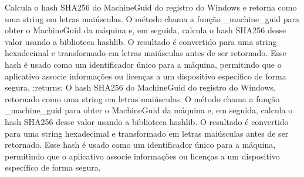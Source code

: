 \documentclass[letterpaper,10pt,english]{sphinxmanual}
\begin{document}
\begin{fulllineitems}
\label{\detokenize{api/simple_lock:simple_lock.machine_id}}
\pysigstartsignatures
\pysiglinewithargsret
{}
{}
{}
\pysigstopsignatures
\sphinxAtStartPar
Calcula o hash SHA\sphinxhyphen{}256 do MachineGuid do registro do Windows e retorna como uma string em letras maiúsculas. O método chama a função \_machine\_guid para obter o MachineGuid da máquina e, em seguida, calcula o hash SHA\sphinxhyphen{}256 desse valor usando a biblioteca hashlib. O resultado é convertido para uma string hexadecimal e transformado em letras maiúsculas antes de ser retornado. Esse hash é usado como um identificador único para a máquina, permitindo que o aplicativo associe informações ou licenças a um dispositivo específico de forma segura.
:returns: O hash SHA\sphinxhyphen{}256 do MachineGuid do registro do Windows, retornado como uma string em letras maiúsculas. O método chama a função \_machine\_guid para obter o MachineGuid da máquina e, em seguida, calcula o hash SHA\sphinxhyphen{}256 desse valor usando a biblioteca hashlib. O resultado é convertido para uma string hexadecimal e transformado em letras maiúsculas antes de ser retornado. Esse hash é usado como um identificador único para a máquina, permitindo que o aplicativo associe informações ou licenças a um dispositivo específico de forma segura.
\begin{quote}\begin{description}
\sphinxAtStartPar
{}

\end{description}\end{quote}

\end{fulllineitems}

\end{document}
